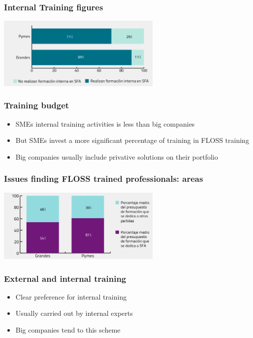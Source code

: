 \documentclass{beamer}
\begin{document}

\begin{frame}
\frametitle{Internal Training figures}
\begin{center}
  \includegraphics[width=8cm]{figs/cenatic_internaltraining.png}
\end{center}
\end{frame}


\begin{frame}
\frametitle{Training budget}
\begin{itemize}
\item SMEs internal training activities is less than big companies
\item But SMEs invest a more significant percentage of training in FLOSS training
\item Big companies usually include privative solutions on their portfolio
\end{itemize}
\end{frame}


\begin{frame}
\frametitle{Issues finding FLOSS trained professionals: areas}
\begin{center}
  \includegraphics[width=8cm]{figs/cenatic_trainingbudget.png}
\end{center}
\end{frame}


\begin{frame}
\frametitle{External and internal training}
\begin{itemize}
\item Clear preference for internal training
\item Usually carried out by internal experts
\item Big companies tend to this scheme 
\end{itemize}
\end{frame}
\end{document}
